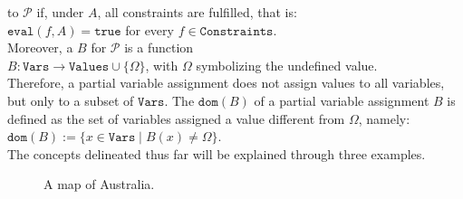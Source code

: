 to $\mathcal{P}$ if, under $A$, all constraints are fulfilled, that is:
\\[0.2cm]
\hspace*{1.3cm}
$\texttt{eval}(f, A) = \texttt{true}$ \quad for every $f \in \texttt{Constraints}$.
\\[0.2cm]
Moreover, a  $B$ for $\mathcal{P}$ is a function 
\\[0.2cm]
\hspace*{1.3cm}
$B: \texttt{Vars} \rightarrow \texttt{Values} \cup \{ \Omega \}$, with $\Omega$ symbolizing the undefined value.
\\[0.2cm]
Therefore, a partial variable assignment does not assign values to all variables, but only to a subset of $\texttt{Vars}$. The  $\texttt{dom}(B)$ of a partial variable assignment $B$ is defined as the set of variables assigned a value different from $\Omega$, namely:
\\[0.2cm]
\hspace*{1.3cm}
$\texttt{dom}(B) := \bigl\{ x \in \texttt{Vars} \mid B(x) \not= \Omega \bigr\}$.
\\[0.2cm]
The concepts delineated thus far will be explained through three examples.



\begin{figure}[!ht]
  \centering
  \caption{A map of Australia.}
  \label{fig:australia.pdf}
\end{figure}

